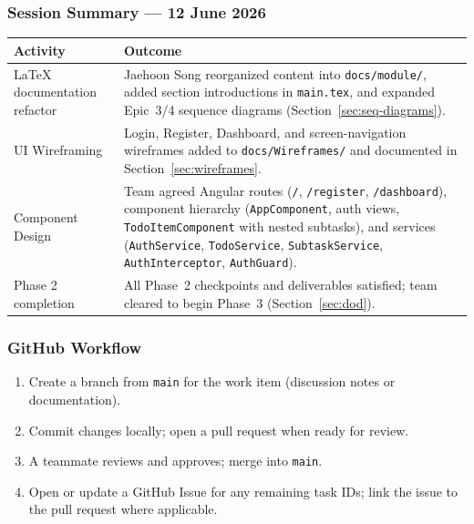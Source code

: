 \subsubsection{Session Summary --- 12 June 2026}
\begin{tabularx}{\textwidth}{@{} l X @{}}
  \toprule
  \textbf{Activity} & \textbf{Outcome} \\
  \midrule
  LaTeX documentation refactor & Jaehoon Song reorganized content into \texttt{docs/module/}, added section introductions in \texttt{main.tex}, and expanded Epic~3/4 sequence diagrams (Section~\ref{sec:seq-diagrams}). \\
  UI Wireframing & Login, Register, Dashboard, and screen-navigation wireframes added to \texttt{docs/Wireframes/} and documented in Section~\ref{sec:wireframes}. \\
  Component Design & Team agreed Angular routes (\texttt{/}, \texttt{/register}, \texttt{/dashboard}), component hierarchy (\texttt{AppComponent}, auth views, \texttt{TodoItemComponent} with nested subtasks), and services (\texttt{AuthService}, \texttt{TodoService}, \texttt{SubtaskService}, \texttt{AuthInterceptor}, \texttt{AuthGuard}). \\
  Phase 2 completion & All Phase~2 checkpoints and deliverables satisfied; team cleared to begin Phase~3 (Section~\ref{sec:dod}). \\
  \bottomrule
\end{tabularx}

\subsubsection{GitHub Workflow}
\begin{enumerate}
  \item Create a branch from \texttt{main} for the work item (discussion notes or documentation).
  \item Commit changes locally; open a pull request when ready for review.
  \item A teammate reviews and approves; merge into \texttt{main}.
  \item Open or update a GitHub Issue for any remaining task IDs; link the issue to the pull request where applicable.
\end{enumerate}

